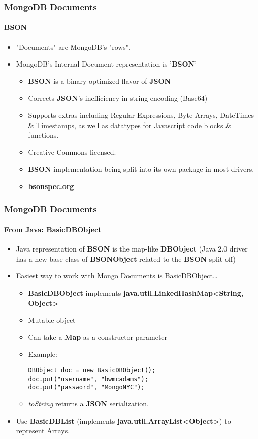 \documentclass{beamer}
\begin{document}
\begin{frame}
\frametitle{MongoDB Documents}
\framesubtitle{BSON}
    \begin{itemize}
        \item "Documents" are MongoDB's "rows". 
        \item MongoDB's Internal Document representation is '{\bf BSON}'
        \begin{itemize}
            \item {\bf BSON} is a binary optimized flavor of {\bf JSON}
            \item Corrects {\bf JSON}'s inefficiency in string encoding (Base64)
            \item Supports extras including Regular Expressions, Byte Arrays, DateTimes \& Timestamps, as well as datatypes for Javascript code blocks \& functions.
            \item Creative Commons licensed.
            \item {\bf BSON} implementation being split into its own package in most drivers.
            \item {\bf bsonspec.org}
        \end{itemize}
    \end{itemize}
\end{frame}

\begin{frame}[fragile]
\frametitle{MongoDB Documents}
\framesubtitle{From Java: BasicDBObject}
    \begin{itemize}
        \item Java representation of {\bf BSON} is the map-like {\bf DBObject} (Java 2.0 driver has a new base class of {\bf BSONObject} related to the {\bf BSON} split-off)
        \item Easiest way to work with Mongo Documents is BasicDBObject\dots
            \begin{itemize}
                \item<2-> {\bf BasicDBObject} implements {\bf java.util.LinkedHashMap<String, Object>}
                \item<3-> Mutable object
                \item<4-> Can take a {\bf Map} as a constructor parameter
                \item<5-> Example: 
                \begin{lstlisting}
DBObject doc = new BasicDBObject();
doc.put("username", "bwmcadams");
doc.put("password", "MongoNYC");
                \end{lstlisting}
                \item<6-> {\em toString} returns a {\bf JSON} serialization.
            \end{itemize}
        \item<7-> Use {\bf BasicDBList} (implements {\bf java.util.ArrayList<Object>}) to represent Arrays.
    \end{itemize}
\end{frame}
\end{document}
